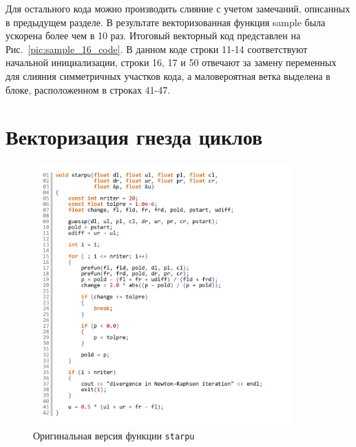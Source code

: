 \documentclass[utf8]{psta}
\begin{document}
Для остального кода можно производить слияние с учетом замечаний, описанных в предыдущем разделе.
В результате векторизованная функция sample была ускорена более чем в 10 раз.
Итоговый векторный код представлен на Рис.~\ref{pic:sample_16_code}.
В данном коде строки 11-14 соответствуют начальной инициализации, строки 16, 17 и 50 отвечают за замену переменных для слияния симметричных участков кода, а маловероятная ветка выделена в блоке, расположенном в строках 41-47.

\section{Векторизация гнезда циклов}

\begin{figure}
\includegraphics[width=10cm]{pics/pic_starpu_code}
\caption{Оригинальная версия функции \texttt{starpu}}
\label{pic:starpu_code}
\end{figure}
\end{document}
